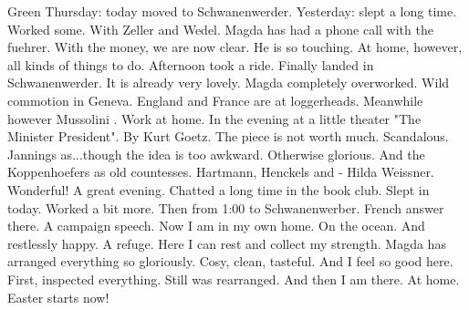 Green Thursday: today moved to Schwanenwerder. Yesterday: slept a long time. Worked some. With Zeller and Wedel. Magda has had a phone call with the fuehrer. With the money, we are now clear. He is so touching. At home, however, all kinds of things to do. Afternoon took a ride. Finally landed in Schwanenwerder. It is already very lovely. Magda completely overworked. Wild commotion in Geneva. England and France are at loggerheads. Meanwhile however Mussolini . Work at home. In the evening at a little theater "The Minister President". By Kurt Goetz. The piece is not worth much. Scandalous.  Jannings as...though the idea is too awkward. Otherwise glorious. And the Koppenhoefers as old countesses. Hartmann, Henckels and - Hilda Weissner. Wonderful! A great evening. Chatted a long time in the book club. Slept in today. Worked a bit more.  Then from 1:00 to Schwanenwerber. French answer there. A campaign speech.  Now I am in my own home. On the ocean. And restlessly happy. A refuge. Here I can rest and collect my strength.  Magda has arranged everything so gloriously. Cosy, clean, tasteful. And I feel so good here. First, inspected everything. Still was rearranged. And then I am there. At home. Easter starts now!